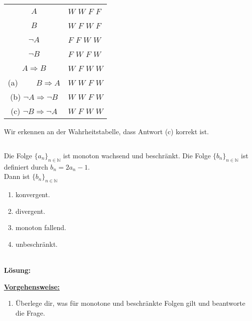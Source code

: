 \begin{center}
	\begin{tabular}{cllll}
		\hline
		\multicolumn{1}{c|}{$A$} & \multicolumn{4}{l}{$W$ $W$ $F$ $F$} \\
		\multicolumn{1}{c|}{$B$} & \multicolumn{4}{l}{$W$ $F$ $W$ $F$} \\ \hline
		\multicolumn{1}{c|}{$ \neg A$} & \multicolumn{4}{l}{$F$ $F$ $W$ $W$} \\
		\multicolumn{1}{c|}{$ \neg B$} & \multicolumn{4}{l}{$F$ $W$ $F$ $W$} \\ \hline
		\multicolumn{1}{c|}{$ A \Rightarrow B$} & \multicolumn{4}{l}{$W$ $F$ $W$ $W$} \\ 
		\multicolumn{1}{c|}{(a) \ \ \ \ $ B \Rightarrow A$} & \multicolumn{4}{l}{$W$ $W$ $F$ $W$} \\
		\multicolumn{1}{c|}{(b) $  \neg A \Rightarrow \neg B$} & \multicolumn{4}{l}{$W$ $W$ $F$ $W$}  \\ 
		\multicolumn{1}{c|}{(c) $\neg B \Rightarrow \neg A$} & \multicolumn{4}{l}{$W$ $F$ $W$ $W$}  \\ 
		\hline
	\end{tabular}
\end{center}
Wir erkennen an der Wahrheitstabelle, dass Antwort (c) korrekt ist.

\newpage

\subsection*{}
Die Folge $ \lbrace a_n \rbrace_{n \in \mathbb{N}} $ ist monoton wachsend und beschränkt. Die Folge $ \lbrace b_n \rbrace_{n \in \mathbb{N} }  $ ist definiert durch $ b_n = 2 a_n -1 $.\\
Dann ist $ \lbrace b_n \rbrace_{n \in \mathbb{N}} $
\renewcommand{\labelenumi}{(\alph{enumi})}
\begin{enumerate}
	\item konvergent.
	\item divergent.
	\item
	monoton fallend.
	\item
	unbeschränkt.
\end{enumerate}
\ \\
\textbf{Lösung:}
\begin{mdframed}
	\underline{\textbf{Vorgehensweise:}}
	\renewcommand{\labelenumi}{\theenumi.}
	\begin{enumerate}
		\item 
		Überlege dir, was für monotone und beschränkte Folgen gilt und beantworte die Frage.	
	\end{enumerate}
\end{mdframed}

